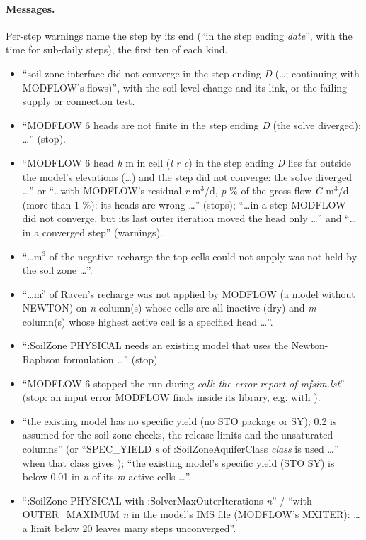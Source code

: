 \paragraph{Messages.} Per-step warnings name the step by its end (``in the step ending \emph{date}'', with the time for
sub-daily steps), the first ten of each kind.
\begin{itemize}
\item ``soil-zone interface did not converge in the step ending \emph{D} (\ldots; continuing with MODFLOW's flows)'', with the
soil-level change and its link, or the failing supply or connection test.
\item ``MODFLOW 6 heads are not finite in the step ending \emph{D} (the solve diverged): \ldots'' (stop).
\item ``MODFLOW 6 head \emph{h} m in cell (\emph{l r c}) in the step ending \emph{D} lies far outside the model's elevations
(\ldots) and the step did not converge: the solve diverged \ldots'' or ``\ldots with MODFLOW's residual \emph{r} m$^3$/d,
\emph{p} \% of the gross flow \emph{G} m$^3$/d (more than 1 \%): its heads are wrong \ldots'' (stops); ``\ldots in a step
MODFLOW did not converge, but its last outer iteration moved the head only \ldots'' and ``\ldots in a converged step'' (warnings).
\item ``\ldots m$^3$ of the negative recharge the top cells could not supply was not held by the soil zone \ldots''.
\item ``\ldots m$^3$ of Raven's recharge was not applied by MODFLOW (a model without NEWTON) on \emph{n} column(s) whose cells are
all inactive (dry) and \emph{m} column(s) whose highest active cell is a specified head \ldots''.
\item ``:SoilZone PHYSICAL needs an existing model that uses the Newton-Raphson formulation \ldots'' (stop).
\item ``MODFLOW 6 stopped the run during \emph{call}: \emph{the error report of mfsim.lst}'' (stop: an input error MODFLOW finds
inside its library, e.g.  with ).
\item ``the existing model has no specific yield (no STO package or SY); 0.2 is assumed for the soil-zone checks, the release
limits and the unsaturated columns'' (or ``SPEC\_YIELD \emph{s} of :SoilZoneAquiferClass \emph{class} is used \ldots'' when that
class gives ); ``the existing model's specific yield (STO SY) is below 0.01 in \emph{n} of its \emph{m}
active cells \ldots''.
\item ``:SoilZone PHYSICAL with :SolverMaxOuterIterations \emph{n}'' / ``with OUTER\_MAXIMUM \emph{n} in the model's IMS file
(MODFLOW's MXITER): \ldots a limit below 20 leaves many steps unconverged''.
\end{itemize}
